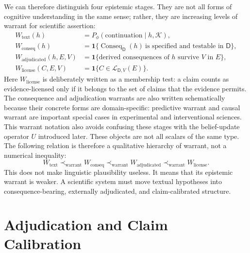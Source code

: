 \documentclass[11pt,a4paper]{article}
\newcommand{\Conseq}{\operatorname{Conseq}}
\newcommand{\Know}{\mathcal{K}}
\newcommand{\Dom}{\mathsf{D}}
\begin{document}
We can therefore distinguish four epistemic stages. They are not all forms of cognitive understanding in the same sense; rather, they are increasing levels of warrant for scientific assertion:
\begin{align}
W_{\mathrm{text}}(h)&=P_\phi(\mathrm{continuation}\mid h,\Know),\\
W_{\mathrm{conseq}}(h)&=\mathbf{1}\{\Conseq_{\Dom}(h)\ \text{is specified and testable in }\Dom\},\\
W_{\mathrm{adjudicated}}(h,E,V)&=\mathbf{1}\{\text{derived consequences of }h\text{ survive }V\text{ in }E\},\\
W_{\mathrm{license}}(C,E,V)&=\mathbf{1}\{C\in\mathcal{L}_{\Dom,V}(E)\}.
\end{align}
Here $W_{\mathrm{license}}$ is deliberately written as a membership test: a claim counts as evidence-licensed only if it belongs to the set of claims that the evidence permits. The consequence and adjudication warrants are also written schematically because their concrete forms are domain-specific: predictive warrant and causal warrant are important special cases in experimental and interventional sciences. This warrant notation also avoids confusing these stages with the belief-update operator $U$ introduced later.
These objects are not all scalars of the same type. The following relation is therefore a qualitative hierarchy of warrant, not a numerical inequality:
\[
W_{\mathrm{text}}\prec_{\mathrm{warrant}}
W_{\mathrm{conseq}}\prec_{\mathrm{warrant}}
W_{\mathrm{adjudicated}}\prec_{\mathrm{warrant}}
W_{\mathrm{license}}.
\]
This does not make linguistic plausibility useless. It means that its epistemic warrant is weaker. A scientific system must move textual hypotheses into consequence-bearing, externally adjudicated, and claim-calibrated structure.

\section{Adjudication and Claim Calibration}
\end{document}
